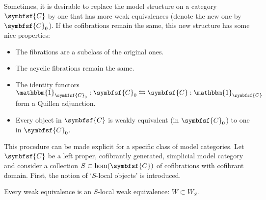     Sometimes, it is desirable to replace the model structure on a category $\symbfsf{C}$ by one that has more weak equivalences (denote the new one by $\symbfsf{C}_0$). If the cofibrations remain the same, this new structure has some nice properties:
    \begin{itemize}
        \item The fibrations are a subclass of the original ones.
        \item The acyclic fibrations remain the same.
        \item The identity functors $\mathbbm{1}_{\symbfsf{C}_0}:\symbfsf{C}_0\leftrightarrows\symbfsf{C}:\mathbbm{1}_{\symbfsf{C}}$ form a Quillen adjunction.
        \item Every object in $\symbfsf{C}$ is weakly equivalent (in $\symbfsf{C}_0$) to one in $\symbfsf{C}_0$.
    \end{itemize}

    This procedure can be made explicit for a specific class of model categories. Let $\symbfsf{C}$ be a left proper, cofibrantly generated, simplicial model category and consider a collection $S\subset\mathrm{hom}(\symbfsf{C})$ of cofibrations with cofibrant domain. First, the notion of `$S$-local objects' is introduced.
    \begin{property}
        Every weak equivalence is an $S$-local weak equivalence: $W\subset W_S$.
    \end{property}


